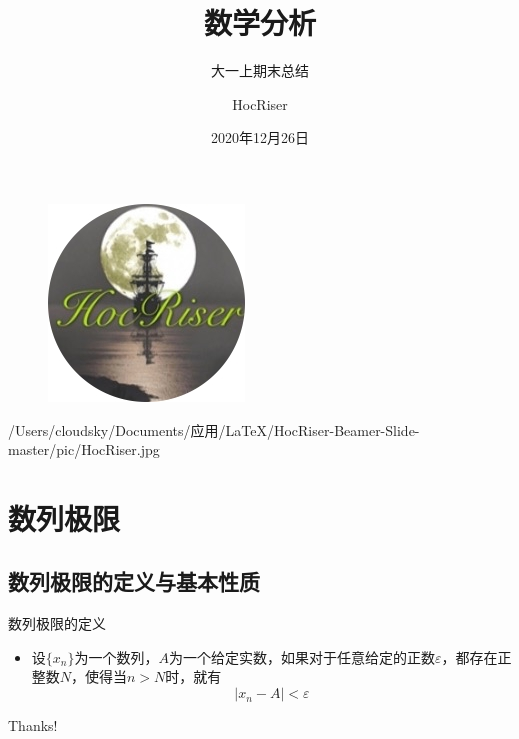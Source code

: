\documentclass{beamer}
\author{HocRiser}
\title{数学分析}
\subtitle{大一上期末总结}
\institute{吉林大学 20级唐计}
\date{2020年12月26日}
\begin{document}
\kaishu
\begin{frame}
	\titlepage
	\begin{figure}[htpb]
		\begin{center}
			\includegraphics[width=0.2\linewidth]{pic/HocRiser.jpg}
		\end{center}
	\end{figure}/Users/cloudsky/Documents/应用/LaTeX/HocRiser-Beamer-Slide-master/pic/HocRiser.jpg
\end{frame}

\begin{frame}
	\tableofcontents[sectionstyle=show,subsectionstyle=show/shaded/hide,subsubsectionstyle=show/shaded/hide]
\end{frame}


\section{数列极限}

\subsection{数列极限的定义与基本性质}

\begin{frame}{数列极限的定义}
	\begin{itemize}[<+-| alert@+>] 
		\item 设$\{x_n\}$为一个数列，$A$为一个给定实数，如果对于任意给定的正数$\varepsilon$，都存在正整数$N$，使得当$n>N$时，就有$$|x_n-A|<\varepsilon$$
	\end{itemize}
\end{frame}

\begin{frame}
	\begin{center}
		{\Huge\calligra Thanks!}
	\end{center}
\end{frame}

\end{document}
